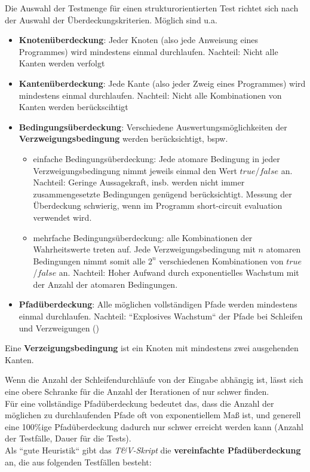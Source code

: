 \noindent
Die Auswahl der Testmenge für einen strukturorientierten Test richtet sich nach der Auswahl der Überdeckungskriterien.
Möglich sind u.a.

\begin{itemize}
    \item \textbf{Knotenüberdeckung}: Jeder Knoten (also jede Anweisung eines Programmes) wird mindestens einmal durchlaufen. Nachteil: Nicht alle Kanten werden verfolgt
    \item \textbf{Kantenüberdeckung}: Jede Kante (also jeder Zweig eines Programmes) wird mindestens einmal durchlaufen. Nachteil: Nicht alle Kombinationen von Kanten werden berückscihtigt
    \item \textbf{Bedingungsüberdeckung}: Verschiedene Auswertungsmöglichkeiten der \textbf{Verzweigungsbedingung} werden berücksichtigt, bspw.
    \begin{itemize}
        \item einfache Bedingungsüberdeckung: Jede atomare Bedingung in jeder Verzweigungsbedingung nimmt jeweils einmal den Wert $true$/$false$ an. Nachteil: Geringe Aussagekraft, insb. werden nicht immer zusammengesetzte Bedingungen genügend berücksichtigt. Messung der Überdeckung schwierig, wenn im Programm short-circuit evaluation verwendet wird.
        \item mehrfache Bedingungsüberdeckung: alle Kombinationen der Wahrheitswerte treten auf. Jede Verzweigungsbedingung mit $n$ atomaren Bedingungen nimmt somit alle $2^n$ verschiedenen Kombinationen von $true$/$false$ an. Nachteil: Hoher Aufwand durch exponentielles Wachstum mit der Anzahl der atomaren Bedingungen.
    \end{itemize}
    \item \textbf{Pfadüberdeckung}: Alle möglichen vollständigen Pfade werden mindestens einmal durchlaufen. Nachteil: ``Explosives Wachstum`` der Pfade bei Schleifen und Verzweigungen (\cite[406]{Bal97})
\end{itemize}

\vspace{5mm}
\begin{tcolorbox}[title={Verzweigungsbedingung}]
    Eine \textbf{Verzeigungsbedingung} ist ein Knoten mit mindestens zwei ausgehenden Kanten.
\end{tcolorbox}
\vspace{5mm}

\noindent
Wenn die Anzahl der Schleifendurchläufe von der Eingabe abhängig ist, lässt sich eine obere Schranke für die Anzahl der Iterationen of nur schwer finden.\\
Für eine vollständige Pfadüberdeckung bedeutet das, dass die Anzahl der möglichen zu durchlaufenden Pfade oft von exponentiellem Maß ist, und generell eine 100\%ige Pfadüberdeckung dadurch nur schwer erreicht werden kann (Anzahl der Testfälle, Dauer für die Tests).\\
Als ``gute Heuristik`` gibt das \textit{T\&V-Skript} die \textbf{vereinfachte Pfadüberdeckung} an, die aus folgenden Testfällen besteht:

